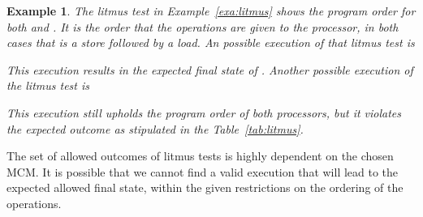 \documentclass[runningheads]{llncs}
\newtheorem{exa}{Example}
\begin{document}
\begin{exa}
\label{exa:litmus2}
The litmus test in Example~\ref{exa:litmus} shows the program order for both {} and {}.
It is the order that the operations are given to the processor, in both cases that is a store followed by a load.
An possible execution of that litmus test is
\begin{table}[H]
\begin{center}
{}
\end{center}
\end{table}
\vspace{-1cm}

This execution results in the expected final state of {}.
Another possible execution of the litmus test is
\begin{table}[H]
\begin{center}
{}
\end{center}
\end{table}
\vspace{-1cm}

This execution still upholds the program order of both processors, but it violates the expected outcome as stipulated in the Table~\ref{tab:litmus}.
\end{exa}

The set of allowed outcomes of litmus tests is highly dependent on the chosen MCM.
It is possible that we cannot find a valid execution that will lead to the expected allowed final state, within the given restrictions on the ordering of the operations.
\end{document}
